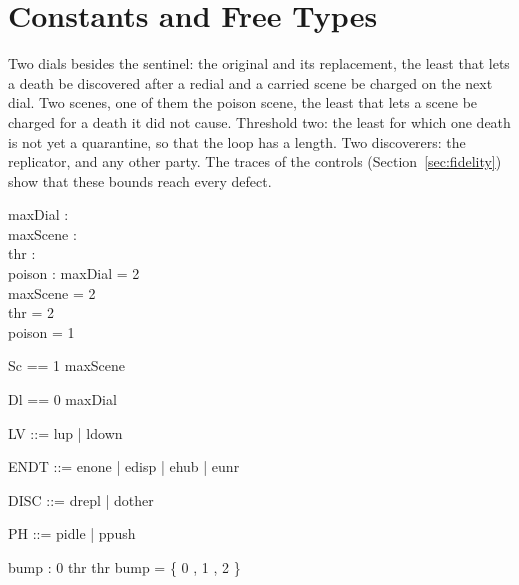 \documentclass[a4paper,10pt,fleqn]{article}
\begin{document}
\section{Constants and Free Types}

Two dials besides the sentinel: the original and its replacement, the least that
lets a death be discovered after a redial and a carried scene be charged on the
next dial.  Two scenes, one of them the poison scene, the least that lets a scene
be charged for a death it did not cause.  Threshold two: the least for which one
death is not yet a quarantine, so that the loop has a length.  Two discoverers:
the replicator, and any other party.  The traces of the controls
(Section~\ref{sec:fidelity}) show that these bounds reach every defect.

\begin{axdef}
  maxDial : \nat \\
  maxScene : \nat \\
  thr : \nat \\
  poison : \nat
\where
  maxDial = 2 \\
  maxScene = 2 \\
  thr = 2 \\
  poison = 1
\end{axdef}

\begin{zed}
  Sc == 1 \upto maxScene
\end{zed}

\begin{zed}
  Dl == 0 \upto maxDial
\end{zed}

\begin{zed}
  LV ::= lup | ldown
\end{zed}

\begin{zed}
  ENDT ::= enone | edisp | ehub | eunr
\end{zed}

\begin{zed}
  DISC ::= drepl | dother
\end{zed}

\begin{zed}
  PH ::= pidle | ppush
\end{zed}

\begin{axdef}
  bump : 0 \upto thr  \upto thr
\where
  bump = \{ 0 , 1 , 2  \}
\end{axdef}
\end{document}
